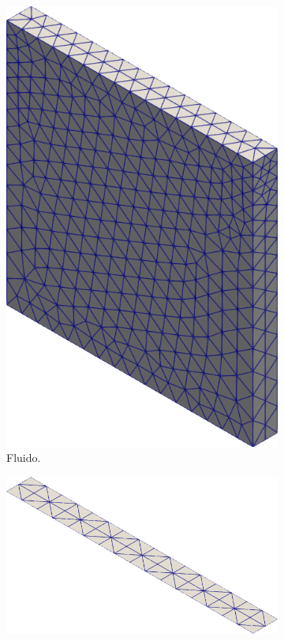 \begin{figure}[h!]
    \centering
    \caption{Cavidade com fundo flexível - Discretização}
    \begin{subfigure}[b]{0.32\textwidth}
        \includegraphics[width=\linewidth]{Figuras/FSI-Cavity2D/fluid-mesh.png}
        \caption{Fluido.}
    \end{subfigure}
    \begin{subfigure}[b]{0.32\textwidth}
        \includegraphics[width=\linewidth]{Figuras/FSI-Cavity2D/shell-mesh.png}

\end{subfigure}
\end{figure}
